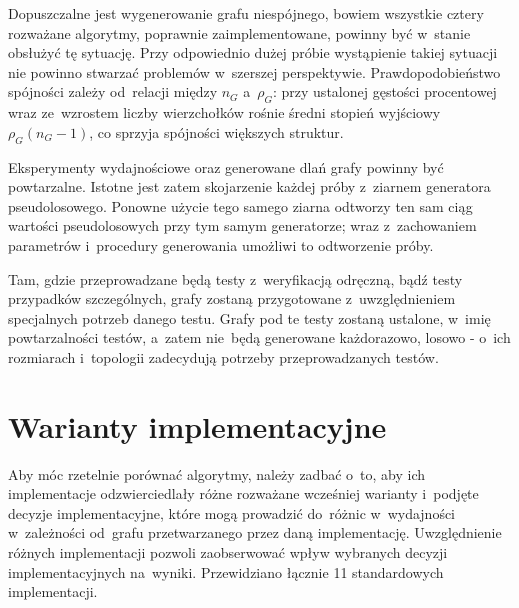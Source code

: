 \documentclass[11pt,a4paper,oneside]{report}
\begin{document}
Dopuszczalne jest wygenerowanie grafu niespójnego, bowiem wszystkie cztery rozważane algorytmy, poprawnie zaimplementowane, powinny być w~stanie obsłużyć tę sytuację. Przy odpowiednio dużej próbie wystąpienie takiej sytuacji nie powinno stwarzać problemów w~szerszej perspektywie. Prawdopodobieństwo spójności zależy od~relacji między $n_G$ a~$\rho_G$: przy ustalonej gęstości procentowej wraz ze~wzrostem liczby wierzchołków rośnie średni stopień wyjściowy $\rho_G(n_G - 1)$, co sprzyja spójności większych struktur.

Eksperymenty wydajnościowe oraz generowane dlań grafy powinny być powtarzalne. Istotne jest zatem skojarzenie każdej próby z~ziarnem generatora pseudolosowego. Ponowne użycie tego samego ziarna odtworzy ten sam ciąg wartości pseudolosowych przy tym samym generatorze; wraz z~zachowaniem parametrów i~procedury generowania umożliwi to odtworzenie próby.

Tam, gdzie przeprowadzane będą testy z~weryfikacją odręczną, bądź testy przypadków szczególnych, grafy zostaną przygotowane z~uwzględnieniem specjalnych potrzeb danego testu. Grafy pod te testy zostaną ustalone, w~imię powtarzalności testów, a~zatem nie~będą generowane każdorazowo, losowo - o~ich rozmiarach i~topologii zadecydują potrzeby przeprowadzanych testów.



\newpage

\section{Warianty implementacyjne}
\label{sec:warianty-implementacyjne}

\begin{center}
\end{center}

Aby móc rzetelnie porównać algorytmy, należy zadbać o~to, aby ich implementacje odzwierciedlały różne rozważane wcześniej warianty i~podjęte decyzje implementacyjne, które mogą prowadzić do~różnic w~wydajności w~zależności od~grafu przetwarzanego przez daną implementację. Uwzględnienie różnych implementacji pozwoli zaobserwować wpływ wybranych decyzji implementacyjnych na~wyniki. Przewidziano łącznie 11 standardowych implementacji.
\end{document}
